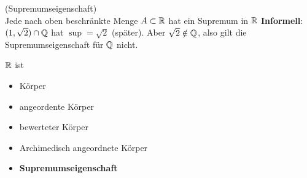  (Supremumseigenschaft)\\
Jede nach oben beschränkte Menge $ A \subset \mathbb{R} $ hat ein Supremum in $ \mathbb{R} $
\textbf{Informell}: $ ( 1, \sqrt{2} ) \cap \mathbb{Q} $ hat $\sup = \sqrt{2} $ (später). Aber $ \sqrt{2} \notin \mathbb{Q} $, also gilt die Supremumseigenschaft für $ \mathbb{Q} $ nicht.\par

$ \mathbb{R} $ ist
\begin{itemize}
	\item Körper
	\item angeordente Körper
	\item bewerteter Körper
	\item Archimedisch angeordnete Körper
	\item \textbf{Supremumseigenschaft}
\end{itemize}

